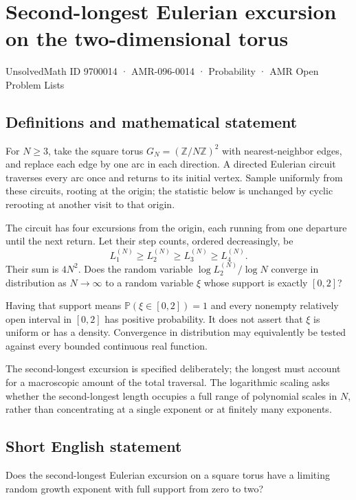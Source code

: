 \documentclass[11pt,a4paper]{article}
\begin{document}
\section*{Second-longest Eulerian excursion on the two-dimensional torus}\label{9700014}
{\small UnsolvedMath ID 9700014 · AMR-096-0014 · Probability · AMR Open Problem Lists}
\subsection{Definitions and mathematical statement}
For $N\ge3$, take the square torus $G_N=(\mathbb Z/N\mathbb Z)^2$ with nearest-neighbor edges, and replace each edge by one arc in each direction. A directed Eulerian circuit traverses every arc once and returns to its initial vertex. Sample uniformly from these circuits, rooting at the origin; the statistic below is unchanged by cyclic rerooting at another visit to that origin.

The circuit has four excursions from the origin, each running from one departure until the next return. Let their step counts, ordered decreasingly, be
\[
L_1^{(N)}\ge L_2^{(N)}\ge L_3^{(N)}\ge L_4^{(N)}.
\]
Their sum is $4N^2$. Does the random variable $\log L_2^{(N)}/\log N$ converge in distribution as $N\to\infty$ to a random variable $\xi$ whose support is exactly $[0,2]$?

Having that support means $\mathbb P(\xi\in[0,2])=1$ and every nonempty relatively open interval in $[0,2]$ has positive probability. It does not assert that $\xi$ is uniform or has a density. Convergence in distribution may equivalently be tested against every bounded continuous real function.

The second-longest excursion is specified deliberately; the longest must account for a macroscopic amount of the total traversal. The logarithmic scaling asks whether the second-longest length occupies a full range of polynomial scales in $N$, rather than concentrating at a single exponent or at finitely many exponents.
\subsection{Short English statement}
Does the second-longest Eulerian excursion on a square torus have a limiting random growth exponent with full support from zero to two?
\end{document}
